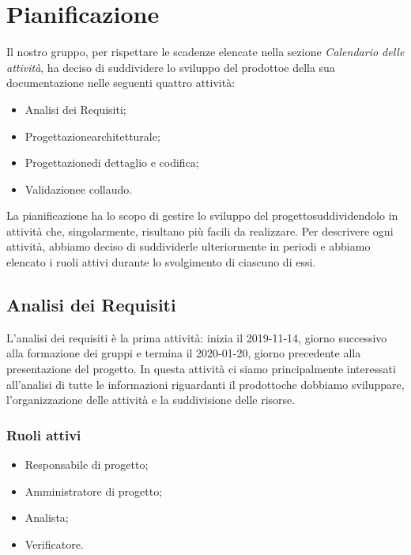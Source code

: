 \section{Pianificazione} 
Il nostro gruppo, per rispettare le scadenze elencate nella sezione \textit{Calendario delle attività}, ha deciso di suddividere lo sviluppo del prodotto\glosp e della sua documentazione nelle seguenti quattro attività:
\begin{itemize}
	\item Analisi dei Requisiti;
	\item Progettazione\glosp architetturale;
	\item Progettazione\glosp di dettaglio e codifica;
	\item Validazione\glosp e collaudo.
\end{itemize}
La pianificazione ha lo scopo di gestire lo sviluppo del progetto\glosp suddividendolo in attività che, singolarmente, risultano più facili da realizzare. Per descrivere ogni attività, abbiamo deciso di suddividerle ulteriormente in periodi e abbiamo elencato i ruoli attivi durante lo svolgimento di ciascuno di essi.

\subsection{Analisi dei Requisiti}
L'analisi dei requisiti è la prima attività: inizia il 2019-11-14, giorno successivo alla formazione dei gruppi e termina il 2020-01-20, giorno precedente alla presentazione del progetto\glo. In questa attività ci siamo principalmente interessati all'analisi di tutte le informazioni riguardanti il prodotto\glosp che dobbiamo sviluppare, l'organizzazione delle attività e la suddivisione delle risorse.

\subsubsection{Ruoli attivi}
\begin{itemize}
	\item Responsabile di progetto\glo;
	\item Amministratore di progetto\glo;
	\item Analista;
	\item Verificatore.
\end{itemize}

